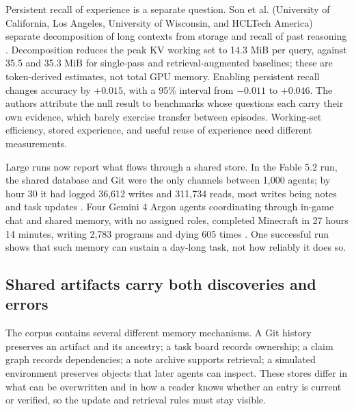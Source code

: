 Persistent recall of experience is a separate question. Son et al. (University of California, Los Angeles, University of Wisconsin, and HCLTech America) separate decomposition of long contexts from storage and recall of past reasoning \citep{persistent-memory-controlled-ablation}. Decomposition reduces the peak KV working set to 14.3 MiB per query, against 35.5 and 35.3 MiB for single-pass and retrieval-augmented baselines; these are token-derived estimates, not total GPU memory. Enabling persistent recall changes accuracy by $+0.015$, with a 95\% interval from $-0.011$ to $+0.046$. The authors attribute the null result to benchmarks whose questions each carry their own evidence, which barely exercise transfer between episodes. Working-set efficiency, stored experience, and useful reuse of experience need different measurements.

Large runs now report what flows through a shared store. In the Fable 5.2 run, the shared database and Git were the only channels between 1,000 agents; by hour 30 it had logged 36,612 writes and 311,734 reads, most writes being notes and task updates \citep{anthropic-fable-team-scaling}. Four Gemini 4 Argon agents coordinating through in-game chat and shared memory, with no assigned roles, completed Minecraft in 27 hours 14 minutes, writing 2,783 programs and dying 605 times \citep{gemini4-argon-minecraft}. One successful run shows that such memory can sustain a day-long task, not how reliably it does so.

\subsection{Shared artifacts carry both discoveries and errors}
The corpus contains several different memory mechanisms. A Git history preserves an artifact and its ancestry; a task board records ownership; a claim graph records dependencies; a note archive supports retrieval; a simulated environment preserves objects that later agents can inspect. These stores differ in what can be overwritten and in how a reader knows whether an entry is current or verified, so the update and retrieval rules must stay visible.

